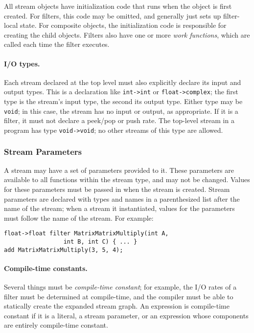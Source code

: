 \documentclass[11pt]{article}
\begin{document}
All stream objects have initialization code that runs when the object
is first created.  For filters, this code may be omitted, and
generally just sets up filter-local state.  For composite objects, the
initialization code is responsible for creating the child objects.
Filters also have one or more \emph{work functions}, which are called
each time the filter executes.

\paragraph{I/O types.}  Each stream declared at the top level must
also explicitly declare its input and output types.  This is a
declaration like \texttt{int->int} or \texttt{float->complex}; the first
type is the stream's input type, the second its output type.  Either
type may be \texttt{void}; in this case, the stream has no input or
output, as appropriate.  If it is a filter, it must not declare a
peek/pop or push rate.  The top-level stream in a program has type
\texttt{void->void}; no other streams of this type are allowed.

\subsubsection{Stream Parameters}

A stream may have a set of parameters provided to it.  These
parameters are available to all functions within the stream type, and
may not be changed.  Values for these parameters must be passed in
when the stream is created.  Stream parameters are declared with types
and names in a parenthesized list after the name of the stream; when a
stream it instantiated, values for the parameters must follow the name
of the stream.  For example:

\begin{verbatim}
float->float filter MatrixMatrixMultiply(int A,
                 int B, int C) { ... }
add MatrixMatrixMultiply(3, 5, 4);
\end{verbatim}

\paragraph{Compile-time constants.}  Several things must
be \emph{compile-time constant}; for example, the I/O rates of a
filter must be determined at compile-time, and the compiler must be
able to statically create the expanded stream graph.  An expression is
compile-time constant if it is a literal, a stream parameter, or an
expression whose components are entirely compile-time constant.
\end{document}
